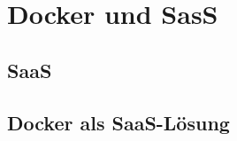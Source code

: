 \chapter{Docker und SasS}
\label{cha:docker_und_saas}

\section{SaaS}
\label{sec:saas}

\section{Docker als SaaS-Lösung}
\label{sec:docker_als_saasLösung}